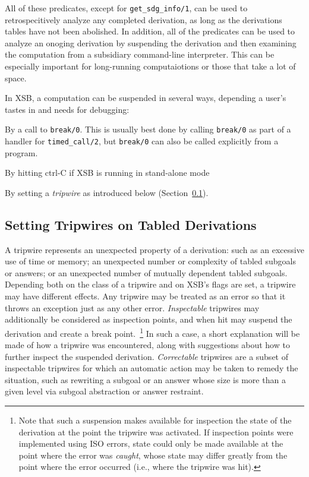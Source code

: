 All of these predicates, except for {\tt get\_sdg\_info/1}, can be
used to retrospecitively analyze any completed derivation, as long as
the derivations tables have not been abolished.  In addition, all of
the predicates can be used to analyze an onoging derivation by
suspending the derivation and then examining the computation from a
subsidiary command-line interpreter.  This can be especially important
for long-running computaiotions or those that take a lot of space.

In XSB, a computation can be suspended in several ways, depending a
user's tastes in and needs for debugging:

\bi 
\item By a call to {\tt break/0}.  This is usually best done by
  calling {\tt break/0} as part of a handler for {\tt timed\_call/2},
  but {\tt break/0} can also be called explicitly from a program.
%
\item By hitting ctrl-C if XSB is running in stand-alone mode

\item By setting a {\em tripwire} as introduced below
  (Section~\ref{sec:tripwire}).  
%
\ei

\subsection{Setting Tripwires on Tabled Derivations} \label{sec:tripwire}
%
A tripwire represents an unexpected property of a derivation: such as
an excessive use of time or memory; an unexpected number or complexity
of tabled subgoals or answers; or an unexpected number of mutually
dependent tabled subgoals.  Depending both on the class of a tripwire
and on XSB's flags are set, a tripwire may have
different effects.  Any tripwire may be treated as an error so that it
throws an exception just as any other error.  {\em Inspectable}
tripwires may additionally be considered as inspection points, and
when hit may suspend the derivation and create a break
point.~\footnote{Note that such a suspension makes available for
  inspection the state of the derivation at the point the tripwire was
  activated.  If inspection points were implemented using ISO errors,
  state could only be made available at the point where the error was
  {\em caught}, whose state may differ greatly from the point where
  the error occurred (i.e., where the tripwire was hit).}
%
In such a case, a short explanation will be made of how a tripwire was
encountered, along with suggestions about how to further inspect the
suspended derivation.  {\em Correctable} tripwires are a subset of
inspectable tripwires for which an automatic action may be taken to
remedy the situation, such as rewriting a subgoal or an answer whose
size is more than a given level via subgoal abstraction or answer
restraint.

